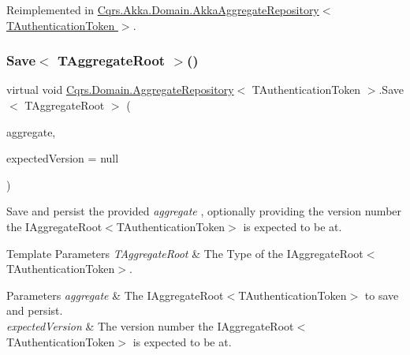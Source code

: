 Reimplemented in \hyperlink{classCqrs_1_1Akka_1_1Domain_1_1AkkaAggregateRepository_a144cbfdedb23039729ba5b3058f84e7a_a144cbfdedb23039729ba5b3058f84e7a}{Cqrs.\+Akka.\+Domain.\+Akka\+Aggregate\+Repository$<$ T\+Authentication\+Token $>$}.

\mbox{\label{classCqrs_1_1Domain_1_1AggregateRepository_aff9e828d19a091a4275f635bee4b3c9b_aff9e828d19a091a4275f635bee4b3c9b}} 
\subsubsection{\texorpdfstring{Save$<$ T\+Aggregate\+Root $>$()}{Save< TAggregateRoot >()}}
{\footnotesize\ttfamily virtual void \hyperlink{classCqrs_1_1Domain_1_1AggregateRepository}{Cqrs.\+Domain.\+Aggregate\+Repository}$<$ T\+Authentication\+Token $>$.Save$<$ T\+Aggregate\+Root $>$ (\begin{DoxyParamCaption}\item[{T\+Aggregate\+Root}]{aggregate,  }\item[{int?}]{expected\+Version = {\ttfamily null} }\end{DoxyParamCaption})\hspace{0.3cm}{\ttfamily [virtual]}}



Save and persist the provided {\itshape aggregate} , optionally providing the version number the I\+Aggregate\+Root$<$\+T\+Authentication\+Token$>$ is expected to be at. 


\begin{DoxyTemplParams}{Template Parameters}
{\em T\+Aggregate\+Root} & The Type of the I\+Aggregate\+Root$<$\+T\+Authentication\+Token$>$.\\
\hline
\end{DoxyTemplParams}

\begin{DoxyParams}{Parameters}
{\em aggregate} & The I\+Aggregate\+Root$<$\+T\+Authentication\+Token$>$ to save and persist.\\
\hline
{\em expected\+Version} & The version number the I\+Aggregate\+Root$<$\+T\+Authentication\+Token$>$ is expected to be at.\\
\hline
\end{DoxyParams}


